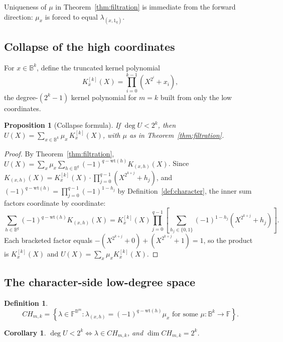 \documentclass[preprint,3p,12pt,numbers]{elsarticle}
\newtheorem{proposition}[theorem]{Proposition}
\newtheorem{corollary}[theorem]{Corollary}
\theoremstyle{definition}
\newtheorem{definition}[theorem]{Definition}
\theoremstyle{remark}
\newcommand{\wt}{\mathrm{wt}}
\begin{document}
Uniqueness of $\mu$ in Theorem~\ref{thm:filtration} is immediate from the
forward direction: $\mu_x$ is forced to equal $\lambda_{(x,1_q)}$.

\subsection{Collapse of the high coordinates}
\label{subsec:collapse}

For $x \in \mathbb{B}^k$, define the truncated kernel polynomial
\[
  K_x^{[k]}(X) = \prod_{i=0}^{k-1} \left( X^{2^i}+x_i \right) ,
\]
the degree-$(2^k-1)$ kernel polynomial for $m=k$ built from only the low
coordinates.

\begin{proposition}[Collapse formula]
\label{prop:collapse}
If $\deg U < 2^k$, then
$U(X) = \sum_{x \in \mathbb{B}^k} \mu_x\, K_x^{[k]}(X)$, with $\mu$ as in
Theorem~\ref{thm:filtration}.
\end{proposition}

\begin{proof}
By Theorem~\ref{thm:filtration},
$U(X) = \sum_{x} \mu_x \sum_{h \in \mathbb{B}^{q}} (-1)^{q-\wt(h)}
K_{(x,h)}(X)$. Since
$K_{(x,h)}(X) = K_x^{[k]}(X) \cdot \prod_{j=0}^{q-1}
\left(X^{2^{k+j}}+h_j\right)$, and $(-1)^{q-\wt(h)} =
\prod_{j=0}^{q-1}(-1)^{1-h_j}$ by Definition~\ref{def:character}, the
inner sum factors coordinate by coordinate:
\[
  \sum_{h \in \mathbb{B}^{q}} (-1)^{q-\wt(h)} K_{(x,h)}(X)
  = K_x^{[k]}(X) \prod_{j=0}^{q-1}
  \left[ \sum_{h_j \in \{0,1\}} (-1)^{1-h_j}
  \left(X^{2^{k+j}}+h_j\right) \right] .
\]
Each bracketed factor equals
$-\!\left(X^{2^{k+j}}+0\right) + \left(X^{2^{k+j}}+1\right) = 1$, so the
product is $K_x^{[k]}(X)$ and $U(X) = \sum_x \mu_x K_x^{[k]}(X)$.
\end{proof}

\subsection{The character-side low-degree space}
\label{subsec:CH}

\begin{definition}
\label{def:CH}
\[
  CH_{m,k} = \left\{ \lambda \in \mathbb{F}^{\mathbb{B}^m} :
  \lambda_{(x,h)} = (-1)^{q-\wt(h)}\mu_x \text{ for some }
  \mu : \mathbb{B}^k \to \mathbb{F} \right\} .
\]
\end{definition}

\begin{corollary}
\label{cor:CH}
$\deg U < 2^k \iff \lambda \in CH_{m,k}$, and $\dim CH_{m,k} = 2^k$.
\end{corollary}
\end{document}
